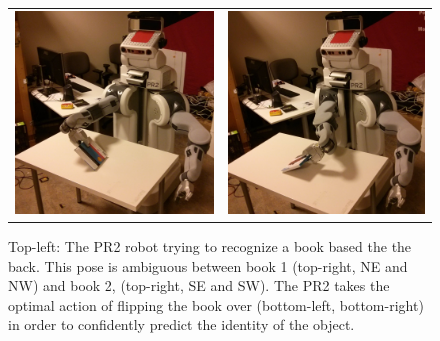 \begin{figure}[ht]
\begin{tabular}{cccc}
    \multicolumn{2}{c}{\includegraphics[width=0.45\columnwidth]{pics/pr2_grasp.jpg}}
    & \multicolumn{2}{c}{\includegraphics[width=0.45\columnwidth]{pics/pr2_rotate.jpg}}
    \end{tabular}
    \caption{Top-left: The PR2 robot trying to recognize a book based the the back. This pose is ambiguous between book 1 (top-right, NE and NW) and book 2, (top-right, SE and SW). The PR2 takes the optimal action of flipping the book over (bottom-left, bottom-right) in order to confidently predict the identity of the object.}
    \label{fig:pr2}
    \end{figure}

